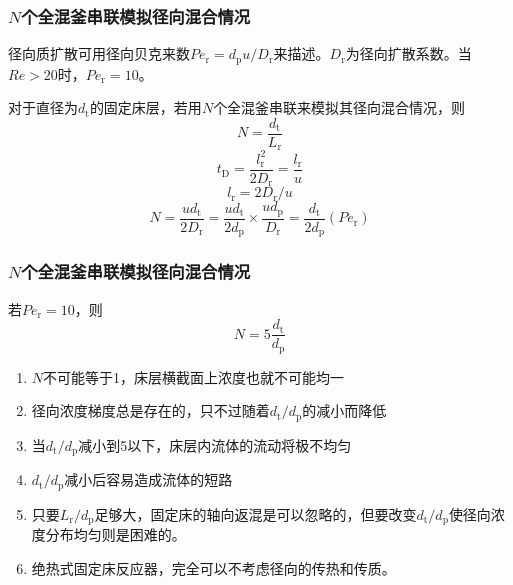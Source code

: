 \begin{frame}
    \frametitle{$N$个全混釜串联模拟径向混合情况}
    径向质扩散可用径向贝克来数$Pe_\mathrm{r}=d_\mathrm{p}u/D_\mathrm{r}$来描述。$D_\mathrm{r}$为径向扩散系数。当$Re>20$时，$Pe_\mathrm{r}=10$。

    对于直径为$d_\mathrm{t}$的固定床层，若用$N$个全混釜串联来模拟其径向混合情况，则
    \[
        N = \frac{d_\mathrm{t}}{L_\mathrm{r}}
    \]
    \[
        t_\mathrm{D} = \frac{l_\mathrm{r}^2}{2D_\mathrm{r}} = \frac{l_\mathrm{r}}{u}
    \]
    \[
        l_\mathrm{r} = 2D_\mathrm{r}/u
    \]
    \[
        N = \frac{ud_\mathrm{t}}{2D_\mathrm{r}} = \frac{ud_\mathrm{t}}{2d_\mathrm{p}}\times \frac{ud_\mathrm{p}}{D_\mathrm{r}} = \frac{d_\mathrm{t}}{2d_\mathrm{p}}(P e_\mathrm{r})
    \]
\end{frame}


\begin{frame}
    \frametitle{$N$个全混釜串联模拟径向混合情况}
    若$Pe_\mathrm{r}=10$，则
    \[
        N = 5\frac{d_\mathrm{t}}{d_\mathrm{p}}
    \]
    \vspace{-1em}
    \begin{enumerate}
      \item $N$不可能等于1，床层横截面上浓度也就不可能均一
      \item 径向浓度梯度总是存在的，只不过随着$d_\mathrm{t}/d_\mathrm{p}$的减小而降低
      \item 当$d_\mathrm{t}/d_\mathrm{p}$减小到5以下，床层内流体的流动将极不均匀
      \item $d_\mathrm{t}/d_\mathrm{p}$减小后容易造成流体的短路
      \item 只要$L_\mathrm{r}/d_\mathrm{p}$足够大，固定床的轴向返混是可以忽略的，但要改变$d_\mathrm{t}/d_\mathrm{p}$使径向浓度分布均匀则是困难的。
      \item 绝热式固定床反应器，完全可以不考虑径向的传热和传质。
    \end{enumerate}
\end{frame}